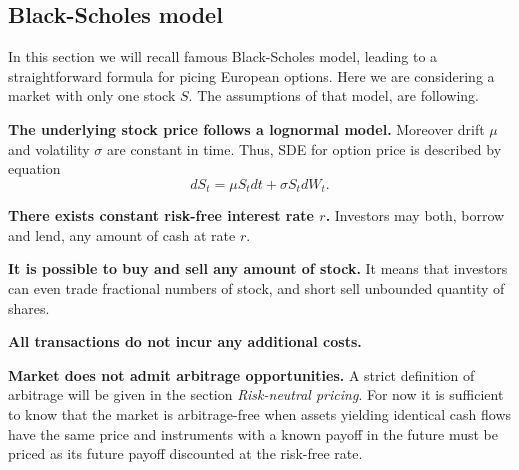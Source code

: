 \documentclass[a4paper,12pt, twoside]{article}
\theoremstyle{definition}
\theoremstyle{remark}
\begin{document}
\FloatBarrier
\subsection{Black-Scholes model}
In this section we will recall famous Black-Scholes model, leading to a straightforward formula for picing European options. Here we are considering a market with only one stock $S$. The assumptions of that model, are following.

\noindent \textbf{The underlying stock price follows a lognormal model.} Moreover drift $\mu$ and volatility $\sigma$ are constant in time. Thus, SDE for option price is described by equation
\begin{equation}
 \label{eq:stockDynamics}
 dS_t = \mu S_t dt + \sigma S_t dW_t. 
\end{equation}

\noindent \textbf{There exists constant risk-free interest rate $r$.} Investors may both, borrow and lend, any amount of cash at rate $r$.

\noindent \textbf{It is possible to buy and sell any amount of stock.} It means that investors can even trade fractional numbers of stock, and short sell unbounded quantity of shares.

\noindent \textbf{All transactions do not incur any additional costs.}

\noindent \textbf{Market does not admit arbitrage opportunities.} A strict definition of arbitrage will be given in the section \textit{Risk-neutral pricing}. For now it is sufficient to know that the market is arbitrage-free when assets yielding identical cash flows have the same price and instruments with a known payoff in the future must be priced as its future payoff discounted at the risk-free rate.
\end{document}
